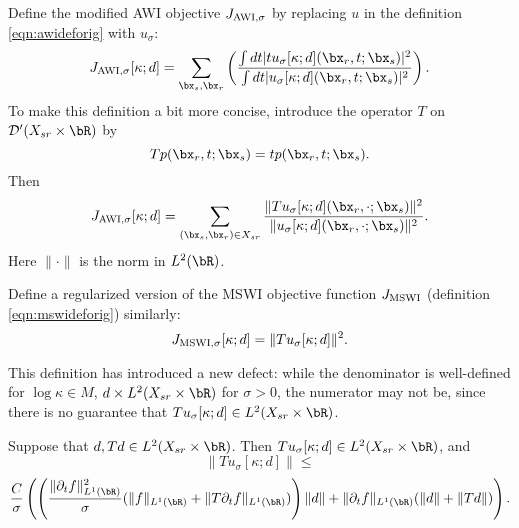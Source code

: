 Define the modified
AWI objective $J_{\rm AWI,\sigma}$ by
replacing $u$ in the definition \ref{eqn:awideforig} with $u_{\sigma}$:
\begin{equation}
  \label{eqn:awidef}
  J_{\rm AWI,\sigma}[\kappa;d] = \sum_{\bx_s,\bx_r} \left(\frac{\int dt |tu_{\sigma}[\kappa;d](\bx_r,t;\bx_s)|^2}{\int dt |u_{\sigma}[\kappa;d](\bx_r,t;\bx_s)|^2}\right). 
\end{equation}
To make this definition a bit more concise, introduce the operator $T$ on
${\cal D}'(X_{sr} \times \bR)$ by
\[
  Tp(\bx_r,t;\bx_s) = tp(\bx_r,t;\bx_s).
\]
Then
\begin{equation}
  \label{eqn:awidefbis}
  J_{\rm AWI,\sigma}[\kappa;d] = \sum_{(\bx_s,\bx_r) \in X_{sr}}
  \frac{\|Tu_{\sigma}[\kappa;d](\bx_r,\cdot;\bx_s)\|^2}{\|u_{\sigma}[\kappa;d](\bx_r,\cdot;\bx_s)\|^2}.
\end{equation}
Here $\| \cdot \|$ is the norm in $L^2(\bR)$.

Define a regularized version of the MSWI objective function $J_{\rm
  MSWI}$ (definition \ref{eqn:mswideforig}) similarly:
\begin{equation}
  \label{eqn:mswidef}
  J_{\rm MSWI,\sigma}[\kappa;d] = \|Tu_{\sigma}[\kappa;d]\|^2.
\end{equation}

This definition has introduced a new defect: while the denominator is
well-defined for $\log \kappa \in M$, $d \times L^2(X_{sr} \times
\bR)$ for $\sigma > 0$, the numerator may not be, since there is no
guarantee that $Tu_{\sigma}[\kappa;d] \in L^2(X_{sr} \times
\bR)$. 

\begin{prop}
  \label{thm:tl2}
  Suppose that $d, Td \in L^2(X_{sr} \times \bR)$. Then
  $Tu_{\sigma}[\kappa;d]  \in L^2(X_{sr} \times \bR)$, and
  \[
    \|Tu_{\sigma}[\kappa;d]\| \le
  \]
  \begin{equation}
    \label{eqn:tunorm}
    \frac{C}{\sigma}\left(\left(
        \frac{\|\partial_t f\|^2_{L^1(\bR)}}{\sigma}(\|f\|_{L^1(\bR)}+\|T\partial_tf\|_{L^1(\bR)})
      \right)\|d\| \\ 
    + \|\partial_t  f\|_{L^1(\bR)}(\|d\| +\|Td\|)\right).
  \end{equation}
\end{prop}

